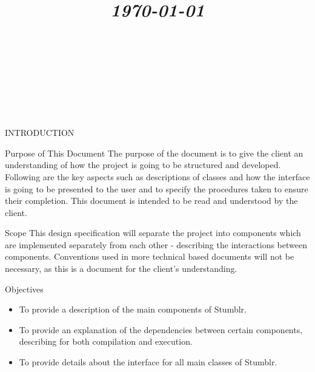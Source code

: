 \documentclass{article}
\title{
	\vspace{1.2in}
	\textmd{\textbf{\doctitle}} \\
	\vspace{0.1in}\large{\textit{\today}} \\
	\vspace{0.4in}
	{\bf{\qanumber}} \\ \vspace{0.4in}
	\version \\
	\status \\
	\vspace{0.4in}
}
\author{\authors}
\date{}
\begin{document}
	\maketitle
	\newpage
	\tableofcontents
	\newpage

	\begin{section}{INTRODUCTION}
		\begin{subsection}{Purpose of This Document}
			The purpose of the document is to give the client an understanding of how the project is going to be structured and developed. Following are the key aspects such as descriptions of classes and how the interface is going to be presented to the user and to specify the procedures taken to ensure their completion. This document is intended to be read and understood by the client.
		\end{subsection}
	
		\begin{subsection}{Scope}
			This design specification will separate the project into components which are implemented separately from each other - describing the interactions between components. Conventions used in more technical based documents will not be necessary, as this is a document for the client's understanding. 
		\end{subsection}
		
		\begin{subsection}{Objectives}
			\begin{itemize}
				\item{To provide a description of the main components of Stumblr.}
				\item{To provide an explanation of the dependencies between certain components, describing for both compilation and execution.}
				\item{To provide details about the interface for all main classes of Stumblr.}
			\end{itemize}
		\end{subsection}
	\end{section}
	
	
	
\end{document}
